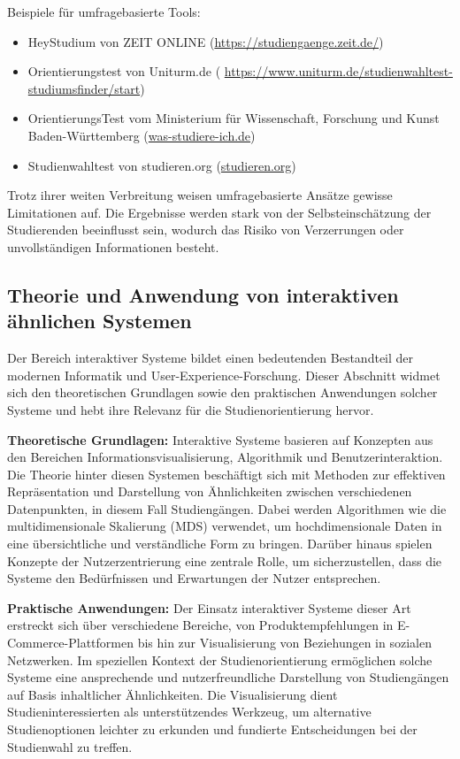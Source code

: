 \noindent
Beispiele für umfragebasierte Tools:
\begin{itemize}
    \item HeyStudium von ZEIT ONLINE (\url{https://studiengaenge.zeit.de/})
    \item Orientierungstest von Uniturm.de (
        \url{https://www.uniturm.de/studienwahltest-studiumsfinder/start})
    \item OrientierungsTest vom Ministerium für Wissenschaft, Forschung und
        Kunst Baden-Württemberg (\url{was-studiere-ich.de})
    \item Studienwahltest von studieren.org (\url{studieren.org})
\end{itemize}

Trotz ihrer weiten Verbreitung weisen umfragebasierte Ansätze gewisse
Limitationen auf. Die Ergebnisse werden stark von der Selbsteinschätzung der
Studierenden beeinflusst sein, wodurch das Risiko von Verzerrungen oder
unvollständigen Informationen besteht.

\subsection{Theorie und Anwendung von interaktiven ähnlichen Systemen}
Der Bereich interaktiver Systeme bildet einen bedeutenden Bestandteil der modernen Informatik und User-Experience-Forschung. Dieser Abschnitt widmet sich den theoretischen Grundlagen sowie den praktischen Anwendungen solcher Systeme und hebt ihre Relevanz für die Studienorientierung hervor. \parencite{preim_interaktive_2010}

\textbf{Theoretische Grundlagen:}
Interaktive Systeme basieren auf Konzepten aus den Bereichen
Informationsvisualisierung, Algorithmik und Benutzerinteraktion. Die Theorie
hinter diesen Systemen beschäftigt sich mit Methoden zur effektiven
Repräsentation und Darstellung von Ähnlichkeiten zwischen verschiedenen
Datenpunkten, in diesem Fall Studiengängen. Dabei werden Algorithmen wie die
multidimensionale Skalierung (MDS) verwendet, um hochdimensionale Daten in eine
übersichtliche und verständliche Form zu bringen. Darüber hinaus spielen
Konzepte der Nutzerzentrierung eine zentrale Rolle, um sicherzustellen, dass die
Systeme den Bedürfnissen und Erwartungen der Nutzer entsprechen.

\textbf{Praktische Anwendungen:}
Der Einsatz interaktiver Systeme dieser Art erstreckt sich über verschiedene
Bereiche, von Produktempfehlungen in E-Commerce-Plattformen bis hin zur
Visualisierung von Beziehungen in sozialen Netzwerken. Im speziellen Kontext der Studienorientierung ermöglichen solche Systeme eine ansprechende und nutzerfreundliche Darstellung von Studiengängen auf Basis inhaltlicher Ähnlichkeiten. Die Visualisierung dient Studieninteressierten als unterstützendes Werkzeug, um alternative Studienoptionen leichter zu erkunden und fundierte Entscheidungen bei der Studienwahl zu treffen.

